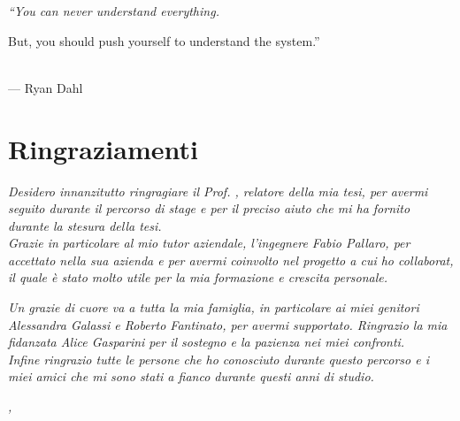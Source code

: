 
\cleardoublepage
{}
{}

\begin{flushright}{
	\slshape    
	``You can never understand everything. 
	
	But, you should push yourself to understand the system.''} \\ 
	\medskip
    --- Ryan Dahl
\end{flushright}


\bigskip

\begingroup
\let\clearpage\relax
\let\cleardoublepage\relax
\let\cleardoublepage\relax

\chapter*{Ringraziamenti}

\noindent \textit{Desidero innanzitutto ringragiare il Prof. \myProf, relatore della mia tesi, per avermi seguito durante il percorso di stage e per il preciso aiuto che mi ha fornito durante la stesura della tesi.} \\

\noindent \textit{Grazie in particolare al mio tutor aziendale, l'ingegnere Fabio Pallaro, per accettato nella sua azienda e per avermi coinvolto nel progetto a cui ho collaborat, il quale è stato molto utile per la mia formazione e crescita personale.}

\noindent \textit{Un grazie di cuore va a tutta la mia famiglia, in particolare ai miei genitori Alessandra Galassi e Roberto Fantinato, per avermi supportato. Ringrazio la mia fidanzata Alice Gasparini per il sostegno e la pazienza nei miei confronti.}\\

\noindent \textit{Infine ringrazio tutte le persone che ho conosciuto durante questo percorso e i miei amici che mi sono stati a fianco durante questi anni di studio.}\\
\bigskip

\noindent\textit{\myLocation, \myTime}
\hfill \myName

\endgroup

